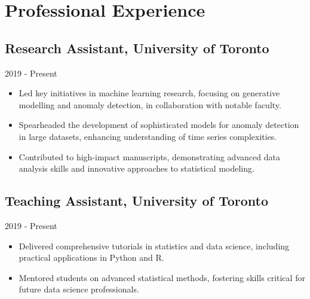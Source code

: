 \section{Professional Experience}
\subsection{Research Assistant, University of Toronto}{2019 - Present}
\begin{itemize}[leftmargin=*]
    \item Led key initiatives in machine learning research, focusing on generative modelling and anomaly detection, in collaboration with notable faculty.
    \item Spearheaded the development of sophisticated models for anomaly detection in large datasets, enhancing understanding of time series complexities.
    \item Contributed to high-impact manuscripts, demonstrating advanced data analysis skills and innovative approaches to statistical modeling.
\end{itemize}
\subsection{Teaching Assistant, University of Toronto}{2019 - Present}
\begin{itemize}[leftmargin=*]
    \item Delivered comprehensive tutorials in statistics and data science, including practical applications in Python and R.
    \item Mentored students on advanced statistical methods, fostering skills critical for future data science professionals.
\end{itemize}
